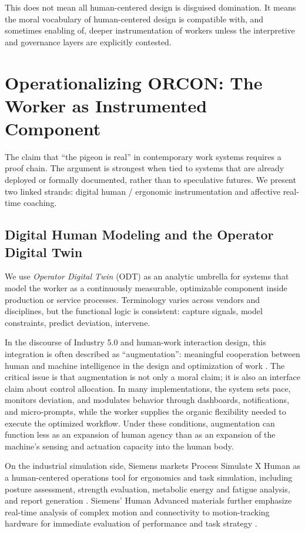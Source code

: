 \documentclass[runningheads]{llncs}
\begin{document}
This does not mean all human-centered design is disguised domination. It means the moral vocabulary of human-centered design is compatible with, and sometimes enabling of, deeper instrumentation of workers unless the interpretive and governance layers are explicitly contested.

\section{Operationalizing ORCON: The Worker as Instrumented Component}

The claim that ``the pigeon is real'' in contemporary work systems requires a proof chain. The argument is strongest when tied to systems that are already deployed or formally documented, rather than to speculative futures. We present two linked strands: digital human / ergonomic instrumentation and affective real-time coaching.

\subsection{Digital Human Modeling and the Operator Digital Twin}

We use \emph{Operator Digital Twin} (ODT) as an analytic umbrella for systems that model the worker as a continuously measurable, optimizable component inside production or service processes. Terminology varies across vendors and disciplines, but the functional logic is consistent: capture signals, model constraints, predict deviation, intervene.

In the discourse of Industry 5.0 and human-work interaction design, this integration is often described as ``augmentation'': meaningful cooperation between human and machine intelligence in the design and optimization of work \cite{breque2021industry,hwid2026cfp}. The critical issue is that augmentation is not only a moral claim; it is also an interface claim about control allocation. In many implementations, the system sets pace, monitors deviation, and modulates behavior through dashboards, notifications, and micro-prompts, while the worker supplies the organic flexibility needed to execute the optimized workflow. Under these conditions, augmentation can function less as an expansion of human agency than as an expansion of the machine's sensing and actuation capacity into the human body.

On the industrial simulation side, Siemens markets Process Simulate X Human as a human-centered operations tool for ergonomics and task simulation, including posture assessment, strength evaluation, metabolic energy and fatigue analysis, and report generation \cite{siemensPSXHuman}. Siemens' Human Advanced materials further emphasize real-time analysis of complex motion and connectivity to motion-tracking hardware for immediate evaluation of performance and task strategy \cite{siemensHumanAdvanced}.
\end{document}
